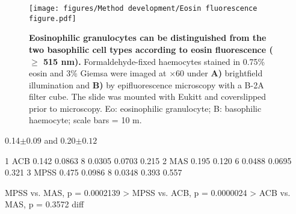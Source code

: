 \begin{figure}[!ht]
    \centering
    \texttt{[image: figures/Method development/Eosin fluorescence figure.pdf]}
    \caption{\textbf{Eosinophilic granulocytes can be distinguished from the two basophilic cell types according to eosin fluorescence ($\geq$ 515 nm).} Formaldehyde-fixed haemocytes stained in 0.75\% eosin and 3\% Giemsa were imaged at $\times$60 under \textbf{A)} brightfield illumination and \textbf{B)} by epifluorescence microscopy with a B-2A filter cube. The slide was mounted with Eukitt\textsuperscript{\textregistered} and coverslipped prior to microscopy. Eo: eosinophilic granulocyte; B: basophilic haemocyte; scale bars = 10 \micro m. }
    \label{fig:reserve}
\end{figure}

0.14$\pm{0.09}$ and  0.20$\pm{0.12}$


1 ACB    0.142  0.0863   8   0.0305   0.0703    0.215
2 MAS    0.195  0.120    6   0.0488   0.0695    0.321
3 MPSS   0.475  0.0986   8   0.0348   0.393     0.557

MPSS vs. MAS, p = 0.0002139 >
MPSS vs. ACB, p = 0.0000024 >
ACB vs.  MAS, p = 0.3572    diff
